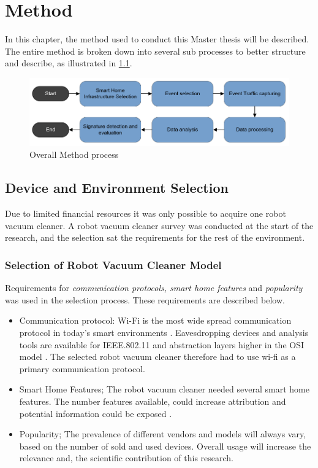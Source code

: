 \chapter{Method}
\label{cap:Method}

In this chapter, the method used to conduct this Master thesis will be described. The entire method is broken down into several sub processes to better structure and describe, as illustrated in  \ref{fig:Method_process}.  

\begin{figure}[H]
    \centering
    \includegraphics[width=\textwidth]{figures/Method_process.png}
    \caption{Overall Method process}
    \label{fig:Method_process}
\end{figure}



\section{Device and Environment Selection}
Due to limited financial resources it was only possible to acquire one robot vacuum cleaner. A robot vacuum cleaner survey was conducted at the start of the research, and the selection sat the requirements for the rest of the environment.  

\subsection{Selection of Robot Vacuum Cleaner Model}
Requirements for \textit{communication protocols, smart home features} and \textit{popularity} was used in the selection process. These requirements are described below.  

\begin{itemize}
    \item Communication protocol: Wi-Fi is the most wide spread communication protocol in today's smart environments \cite{robotsel1}. Eavesdropping devices and analysis tools are available for IEEE.802.11 and abstraction layers higher in the OSI model \cite{osimodel}. The selected robot vacuum cleaner therefore had to use wi-fi as a primary communication protocol.
    
    \item Smart Home Features; The robot vacuum cleaner needed several smart home features. The number features available, could increase attribution and potential information could be exposed \cite{robotsel4}.
    
    \item Popularity; The prevalence of different vendors and models will always vary, based on the number of sold and used devices. Overall usage will increase the relevance and, the scientific contribution of this research.  
\end{itemize}

